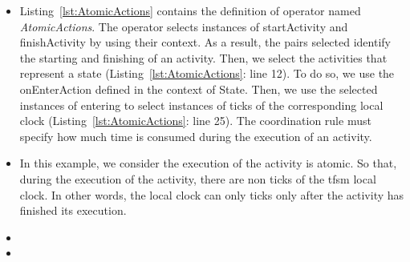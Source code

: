 \begin{itemize}
\begin{lstlisting}[language=bcool,
caption={Timing coordination operator between TFSM and fUML language},
label={lst:AtomicActions}, 
basicstyle=\scriptsize\ttfamily, backgroundcolor=\color{LGrey}, numbers=left, xleftmargin=2pt, firstnumber=11]
Operator  AtomicActions (activityStart : ad::startActivity , activityStop : ad::finishActivity, enterState : tfsm::entering, leaveState : tfsm::leaving, timeTicks : tfsm::ticks)
CorrespondenceMatching: when ((activityStart.name = activityStop.name ) and (activityStart.name = enterState.OnEnterAction.name ) and (enterState.owningFSM.localClock = timeTicks));
CoordinationRule: 
 AtomicExec (activityStart, activityStop, timeTicks)
end operator;
\end{lstlisting}
		
		\item Listing~\ref{lst:AtomicActions} contains the definition of operator named \emph{AtomicActions}. The operator selects instances of \dse startActivity and finishActivity by using their context. As a result, the pairs selected identify the starting and finishing of an activity. Then, we select the activities that represent a state (Listing~\ref{lst:AtomicActions}: line 12). To do so, we use the onEnterAction defined in the context of State. Then, we use the selected instances of \dse entering to select instances of \dse ticks of the corresponding local clock (Listing~\ref{lst:AtomicActions}: line 25). The coordination rule must specify how much time is consumed during the execution of an activity.
		
		\item In this example, we consider the execution of the activity is atomic. So that, during the execution of the activity, there are non ticks of the tfsm local clock. In other words, the local clock can only ticks only after the activity has finished its execution. 
		
		\item {}
		
		\item {}
		

\end{itemize}
